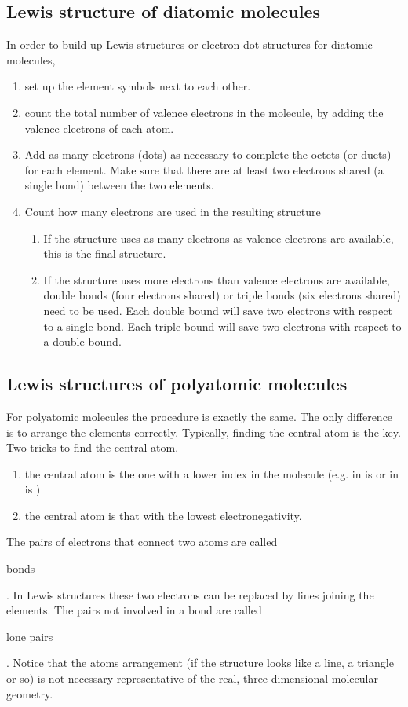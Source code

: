 \documentclass[main.tex]{subfiles}
\begin{document}
\subsection*{Lewis structure of diatomic molecules}
In order to build up Lewis structures or electron-dot structures for diatomic molecules, 
\begin{enumerate} 
\item set up the element symbols next to each other. 
\item count the total number of valence electrons in the molecule, by adding the valence electrons of each atom. 
\item Add as many electrons (dots) as necessary to complete the octets (or duets) for each element. Make sure that there are at least two electrons shared (a single bond) between the two elements. 
\item Count how many electrons are used in the resulting structure
\begin{enumerate}
\item If the structure uses as many electrons as valence electrons are available, this is the final structure.
\item If the structure uses more electrons than valence electrons are available, double bonds (four electrons shared) or triple bonds (six electrons shared) need to be used. Each double bound will save two electrons with respect to a single bond. Each triple bound will save two electrons with respect to a double bound.
 \end{enumerate}
 \end{enumerate}
 
\subsection*{Lewis structures of polyatomic molecules}
For polyatomic molecules the procedure is exactly the same. The only difference is to arrange the elements correctly. Typically, finding the central atom is the key. Two tricks to find the central atom.
\begin{enumerate}
\item the central atom is the one with a lower index in the molecule (e.g. in  is  or in  is )
\item the central atom is that with the lowest electronegativity.
\end{enumerate}
The pairs of electrons that connect two atoms are called \begin{it}bonds\end{it}. In Lewis structures these two electrons can be replaced by lines joining the elements. The pairs not involved in a bond are called \begin{it}lone pairs\end{it}. Notice that the atoms arrangement (if the structure looks like a line, a triangle or so) is not necessary representative of the real, three-dimensional molecular geometry.
 
\end{document}
